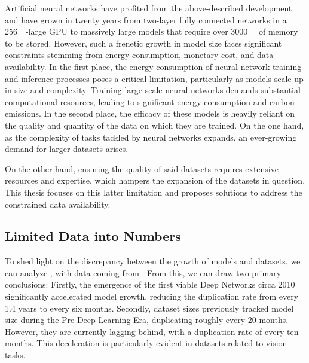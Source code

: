 Artificial neural networks have profited from the above-described development and have grown in twenty years from two-layer fully connected networks in a \qty{256}{\mega\byte}-large GPU to massively large models that require over \qty{3000}{\giga\byte} of memory to be stored. However, such a frenetic growth in model size faces significant constraints stemming from energy consumption, monetary cost, and data availability. In the first place, the energy consumption of neural network training and inference processes poses a critical limitation, particularly as models scale up in size and complexity. Training large-scale neural networks demands substantial computational resources, leading to significant energy consumption and carbon emissions. In the second place, the efficacy of these models is heavily reliant on the quality and quantity of the data on which they are trained. On the one hand, as the complexity of tasks tackled by neural networks expands, an ever-growing demand for larger datasets arises.

On the other hand, ensuring the quality of said datasets requires extensive resources and expertise, which hampers the expansion of the datasets in question. This thesis focuses on this latter limitation and proposes solutions to address the constrained data availability.

\subsection{Limited Data into Numbers}
To shed light on the discrepancy between the growth of models and datasets, we can analyze , with data coming from . From this, we can draw two primary conclusions: Firstly, the emergence of the first viable Deep Networks circa 2010 significantly accelerated model growth, reducing the duplication rate from every 1.4 years to every six months. Secondly, dataset sizes previously tracked model size during the Pre Deep Learning Era, duplicating roughly every 20 months. However, they are currently lagging behind, with a duplication rate of every ten months. This deceleration is particularly evident in datasets related to vision tasks.

